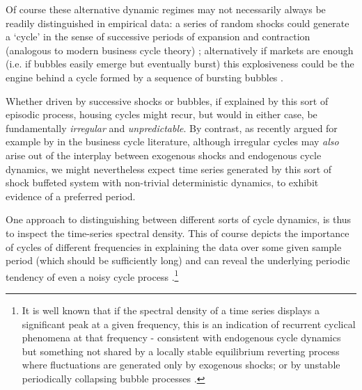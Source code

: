 \documentclass[11pt]{article}
\begin{document}
Of course these alternative dynamic regimes may not necessarily always be readily distinguished in empirical data:
a series of random shocks could generate a ‘cycle’ in the sense of successive periods of expansion and contraction (analogous to modern business cycle theory) \citep{Bracke2013}; alternatively if markets are  enough (i.e. if bubbles easily emerge but eventually burst) this explosiveness could be the engine behind a cycle formed by a sequence of bursting bubbles \citep{Evans1991,Shi2007,Shi2017}. %

Whether driven by successive shocks or bubbles, if explained by this sort of episodic process, housing cycles might recur, but would in either case, be fundamentally \textit{irregular} and \textit{unpredictable}. By contrast, as recently argued for example by \cite{Beaudry2020} in the business cycle literature, although irregular cycles may \textit{also} arise out of the interplay between exogenous shocks and endogenous cycle dynamics, we might nevertheless expect time series generated by this sort of shock buffeted system with non-trivial deterministic dynamics, to exhibit evidence of a preferred period.  %


One approach to distinguishing between different sorts of cycle dynamics, is thus to inspect the time-series spectral density. This of course depicts the importance of cycles of different frequencies in explaining the data over some given sample period (which should be sufficiently long) and can reveal the underlying periodic tendency of even a noisy cycle process \citep{Beaudry2020}.\footnote{It is well known that if the spectral density of a time series displays a significant peak at a given frequency, this is an indication of recurrent cyclical phenomena at that frequency - consistent with endogenous cycle dynamics but something not shared by a locally stable equilibrium reverting process where fluctuations are generated only by exogenous shocks; or by unstable periodically collapsing bubble processes \citep{Evans1991}.} 
\end{document}
